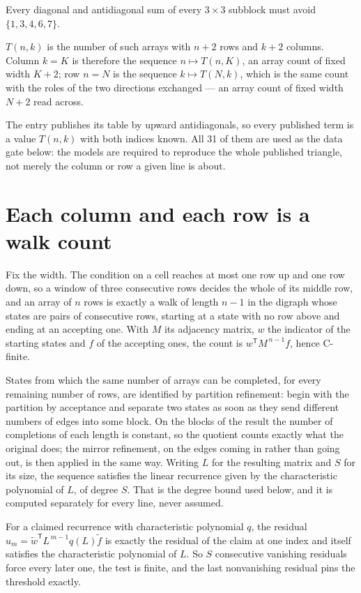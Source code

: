 \documentclass[11pt]{article}
\theoremstyle{definition}
\begin{document}
Every diagonal and antidiagonal sum of every $3\times3$ subblock must avoid $\{1, 3, 4, 6, 7\}$.

$T(n,k)$ is the number of such arrays with $n + 2$ rows and $k + 2$ columns. Column $k = K$ is therefore the sequence $n \mapsto T(n,K)$, an array count of fixed width $K + 2$; row $n = N$ is the sequence $k \mapsto T(N,k)$, which is the same count with the roles of the two directions exchanged --- an array count of fixed width $N + 2$ read across.

The entry publishes its table by upward antidiagonals, so every published term is a value $T(n,k)$ with both indices known. All 31 of them are used as the data gate below: the models are required to reproduce the whole published triangle, not merely the column or row a given line is about.

\section{Each column and each row is a walk count}

Fix the width. The condition on a cell reaches at most one row up and one row down, so a window of three consecutive rows decides the whole of its middle row, and an array of $n$ rows is exactly a walk of length $n-1$ in the digraph whose states are pairs of consecutive rows, starting at a state with no row above and ending at an accepting one. With $M$ its adjacency matrix, $w$ the indicator of the starting states and $f$ of the accepting ones, the count is $w^{\mathsf T}M^{\,n-1}f$, hence C-finite.

States from which the same number of arrays can be completed, for every remaining number of rows, are identified by partition refinement: begin with the partition by acceptance and separate two states as soon as they send different numbers of edges into some block. On the blocks of the result the number of completions of each length is constant, so the quotient counts exactly what the original does; the mirror refinement, on the edges coming in rather than going out, is then applied in the same way. Writing $L$ for the resulting matrix and $S$ for its size, the sequence satisfies the linear recurrence given by the characteristic polynomial of $L$, of degree $S$. That is the degree bound used below, and it is computed separately for every line, never assumed.

For a claimed recurrence with characteristic polynomial $q$, the residual $u_m = \tilde w^{\mathsf T}L^{\,m-1}q(L)\tilde f$ is exactly the residual of the claim at one index and itself satisfies the characteristic polynomial of $L$. So $S$ consecutive vanishing residuals force every later one, the test is finite, and the last nonvanishing residual pins the threshold exactly.
\end{document}
